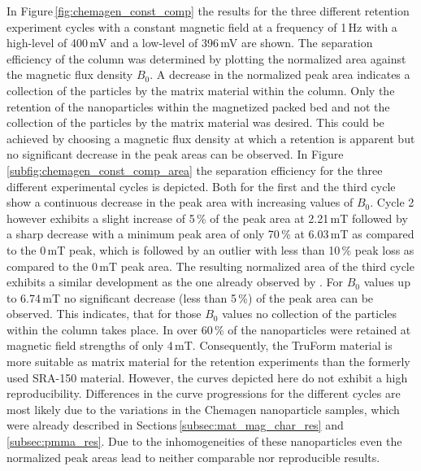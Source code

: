 In Figure\,\ref{fig:chemagen_const_comp} the results for the three different retention experiment cycles with a constant magnetic field at a frequency of 1\,Hz with a high-level of 400\,mV and a low-level of 396\,mV are shown. The separation efficiency of the column was determined by plotting the normalized area against the magnetic flux density $B_{0}$. A decrease in the normalized peak area indicates a collection of the particles by the matrix material within the column. Only the retention of the nanoparticles within the magnetized packed bed and not the collection of the particles by the matrix material was desired. This could be achieved by choosing a magnetic flux density at which a retention is apparent but no significant decrease in the peak areas can be observed. In Figure\,\ref{subfig:chemagen_const_comp_area} the separation efficiency for the three different experimental cycles is depicted. Both for the first and the third cycle show a continuous decrease in the peak area with increasing values of $B_{0}$. Cycle 2 however exhibits a slight increase of 5\,\% of the peak area at 2.21\,mT followed by a sharp decrease with a minimum peak area of only 70\,\% at 6.03\,mT as compared to the 0\,mT peak, which is followed by an outlier with less than 10\,\% peak loss as compared to the 0\,mT peak area. The resulting normalized area of the third cycle exhibits a similar development as the one already observed by \cite{AndreMaster}. For $B_{0}$ values up to 6.74\,mT no significant decrease (less than 5\,\%) of the peak area can be observed. This indicates, that for those $B_{0}$ values no collection of the particles within the column takes place. In \cite{AndreMaster} over 60\,\% of the nanoparticles were retained at magnetic field strengths of only 4\,mT. Consequently, the TruForm material is more suitable as matrix material for the retention experiments than the formerly used SRA-150 material. However, the curves depicted here do not exhibit a high reproducibility.  Differences in the curve progressions for the different cycles are most likely due to the variations in the Chemagen nanoparticle samples, which were already described in Sections\,\ref{subsec:mat_mag_char_res} and \ref{subsec:pmma_res}. Due to the inhomogeneities of these nanoparticles even the normalized peak areas lead to neither comparable nor reproducible results.     

